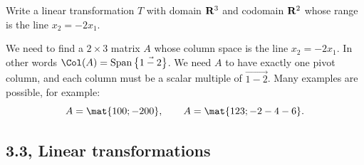 \begin{problems}
\problem Write a linear transformation $T$ with domain ${\bf R}^3$ and
codomain ${\bf R}^2$ whose range is the line $x_2 = -2x_1$.

\begin{solution}
  We need to find a $2 \times 3$ matrix $A$ whose column space is the
  line $x_2 = -2x_1$.  In other words
  $\Col(A) = \textup{Span}\left\{ \vec{1 -2}\right\}$.  We need $A$ to
  have exactly one pivot column, and each column must be a scalar
  multiple of $\vec{1 -2}$.  Many examples are possible, for example:
  \[A = \mat{1 0 0; -2 0 0}, \qquad A = \mat{1 2 3; -2 -4 -6}.\]
\end{solution}

\end{problems}\setcounter{problem}{0}
\newpage

\subsection{3.3, Linear transformations}

